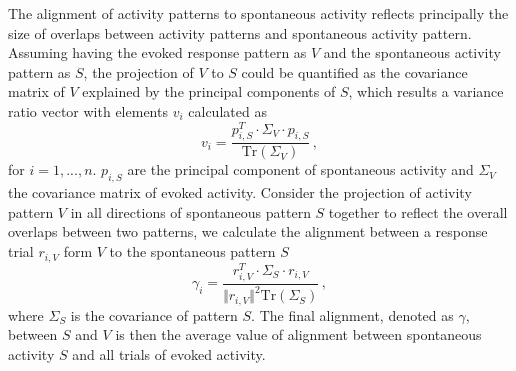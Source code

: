\documentclass[11pt]{article}
\begin{document}
	The alignment of activity patterns to spontaneous activity reflects principally the size of overlaps between activity patterns and spontaneous activity pattern. 
	Assuming having the evoked response pattern as $V$ and the spontaneous activity pattern as $S$, the projection of $V$ to $S$ could be quantified as the covariance matrix of $V$ explained by the principal components of $S$, which results a variance ratio vector with elements $v_i$ calculated as
		\begin{equation} \label{eq:var_explain_spont_act_sym}
			v_i = \frac{p_{i, S}^T \cdot \Sigma_V \cdot p_{i, S}}{\text{Tr}(\Sigma_V)} \, , 
		\end{equation}
	for $i = 1, ..., n$. $p_{i, S}$ are the principal component of spontaneous activity and $\Sigma_V$ the covariance matrix of evoked activity. 
	Consider the projection of activity pattern $V$ in all directions of spontaneous pattern $S$ together to reflect the overall overlaps between two patterns, we calculate the alignment between a response trial $r_{i, V}$ form $V$ to the spontaneous pattern $S$ 
		\begin{equation} \label{eq:align_to_spont_act_sym}
			\gamma_i = \frac{r^T_{i, V} \cdot \Sigma_S \cdot r_{i,V}}{\Vert r_{i, V} \Vert^2 \text{Tr}(\Sigma_S)}\, ,
		\end{equation}
	where $\Sigma_S$ is the covariance of pattern $S$. The final alignment, denoted as $\gamma$, between $S$ and $V$ is then the average value of alignment between spontaneous activity $S$ and all trials of evoked activity. 
	
\end{document}
